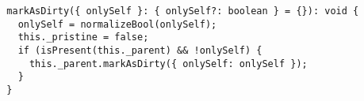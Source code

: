 \begin{verbatim}
  markAsDirty({ onlySelf }: { onlySelf?: boolean } = {}): void {
    onlySelf = normalizeBool(onlySelf);
    this._pristine = false;
    if (isPresent(this._parent) && !onlySelf) {
      this._parent.markAsDirty({ onlySelf: onlySelf });
    }
  }
\end{verbatim}
